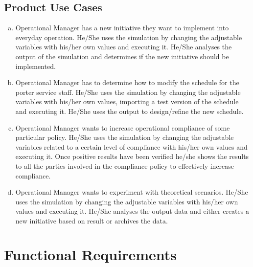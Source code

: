\documentclass[paper=letter, fontsize=10pt]{scrartcl}
\numberwithin{equation}{section}		%
\numberwithin{figure}{section}			%
\numberwithin{table}{section}				%
\begin{document}
\subsection{Product Use Cases}
\begin{enumerate}[(a)]
	\item Operational Manager has a new initiative they want to implement into everyday operation. He/She uses the simulation by changing the adjustable variables with his/her own values and executing it. He/She analyses the output of the simulation and determines if the new initiative should be implemented.
	\item Operational Manager has to determine how to modify the schedule for the porter service staff. He/She uses the simulation by changing the adjustable variables with his/her own values, importing a test version of the schedule and executing it. He/She uses the output to design/refine the new schedule.
	\item Operational Manager wants to increase operational compliance of some particular policy. He/She uses the simulation by changing the adjustable variables related to a certain level of compliance with his/her own values and executing it. Once positive results have been verified he/she shows the results to all the parties involved in the compliance policy to effectively increase compliance.
	\item Operational Manager wants to experiment with theoretical scenarios. He/She uses the simulation by changing the adjustable variables with his/her own values and executing it. He/She analyses the output data and either creates a new initiative based on result or archives the data.
	     
\end{enumerate}

\section{Functional Requirements}
\end{document}
